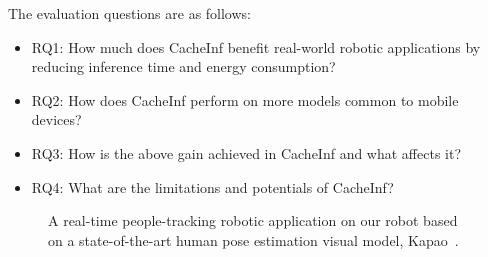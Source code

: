 The evaluation questions are as follows:
\begin{itemize}
    \item RQ1: How much does CacheInf benefit real-world robotic applications by reducing inference time and energy consumption?
    \item RQ2: How does CacheInf perform on more models common to mobile devices?
    \item RQ3: How is the above gain achieved in CacheInf and what affects it?
    \item RQ4: What are the limitations and potentials of CacheInf?
\end{itemize}

\begin{figure}[!t]
    \centering
    \hfil
    \caption{A real-time people-tracking robotic application on our robot based on a state-of-the-art human pose estimation visual model, Kapao~\cite{kapao}.}
    \label{fig:kapao}
\end{figure}

